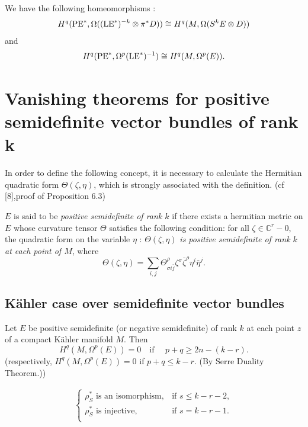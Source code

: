 \documentclass[lang=en,12pt]{beautybook}
\begin{document}
We have the following homeomorphisms \cite[Theorem 2.1, P504 and P502]{kobayashi1970complex}:
\[ H^q (\operatorname{PE}^{\ast}, \Omega ((\operatorname{LE}^{\ast})^{- k} \otimes \pi^{\ast}
  D)) \cong H^q (M, \Omega (S^k E \otimes D)) \]
and
\[ H^q (\operatorname{PE}^{\ast}, \Omega^p (\operatorname{LE}^{\ast})^{- 1}) \cong H^q (M,
  \Omega^p (E)) . \]

\section{Vanishing theorems for positive semidefinite vector bundles of rank
  k}

In order to define the following concept, it is necessary to calculate the
Hermitian quadratic form $\Theta (\zeta, \eta)$, which is strongly associated
with the definition. (cf [8],proof of Proposition 6.3)

\begin{definition}
  $E$ is said to be {\emph{positive semidefinite of rank $k$}} if
  there exists a hermitian metric on $E$ whose curvature tensor $\Theta$
  satisfies the following condition: for all $\zeta \in \mathbb{C}^r - 0$, the
  quadratic form on the variable $\eta$ : $\Theta (\zeta, \eta)$
  {\emph{is positive semidefinite of rank $k$ at each point of $M$}}, where
  \[ \Theta (\zeta, \eta) = \sum_{i, j} \Theta_{\sigma i \bar{j}}^{\rho}
    \zeta^{\sigma} \bar{\zeta}^{\rho} \eta^i \bar{\eta}^j . \]
\end{definition}

\subsection{K\"ahler case over semidefinite vector bundles}

\begin{theorem}
  Let $E$ be positive semidefinite (or negative semidefinite) of rank $k$ at
  each point $z$ of a compact K{\"a}hler manifold $M$. Then
  \[ H^q (M, \Omega^p (E)) = 0 \quad \text{if } \quad p + q \geqslant 2 n - (k
    - r) . \]
  (respectively, $H^q (M, \Omega^p (E)) = 0$ if $p + q \leqslant k - r$. (By
  Serre Duality Theorem.))
\end{theorem}
\begin{theorem}
  \begin{align*}
    \begin{cases}
      \rho_S^* \text{ is an isomorphism}, & \text{if } s\leqslant k-r-2, \\
      \rho_S^* \text{ is injective},      & \text{if } s= k-r-1.         \\
    \end{cases}
  \end{align*}

\end{theorem}
\end{document}
